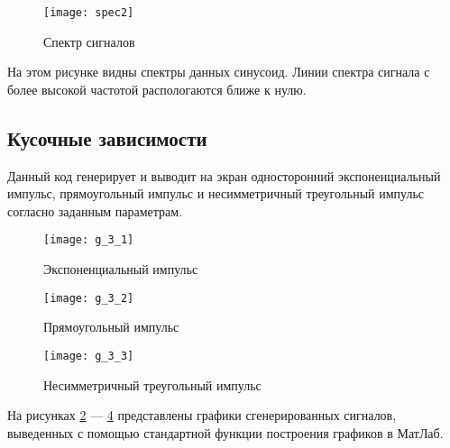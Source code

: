 \begin{figure}[H]
	\begin{center}
		\texttt{[image: spec2]}
		\caption{Спектр сигналов} 
		\label{pic:spec2} %
	\end{center}
\end{figure}
На этом рисунке видны спектры данных синусоид. Линии спектра сигнала с более высокой частотой распологаются ближе к нулю.

\subsection{Кусочные зависимости}


\parindent=1cm
Данный код генерирует и выводит на экран односторонний экспоненциальный импульс, прямоугольный импульс и несимметричный треугольный импульс согласно заданным параметрам.

\begin{figure}[H]
	\begin{center}
		\texttt{[image: g\_3\_1]}
		\caption{Экспоненциальный импульс} 
		\label{pic:g_3_1} %
	\end{center}
\end{figure}
\begin{figure}[H]
	\begin{center}
		\texttt{[image: g\_3\_2]}
		\caption{Прямоугольный импульс} 
		\label{pic:g_3_2} %
	\end{center}
\end{figure}
\begin{figure}[H]
	\begin{center}
		\texttt{[image: g\_3\_3]}
		\caption{Несимметричный треугольный импульс} 
		\label{pic:g_3_3} %
	\end{center}
\end{figure}
На рисунках  \ref{pic:g_3_1} — \ref{pic:g_3_3} представлены графики сгенерированных сигналов, выведенных с помощью стандартной функции построения графиков в МатЛаб.

